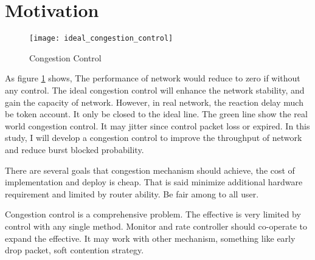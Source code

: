 \cleardoublepage
\section{Motivation}

\begin{figure}[!htbp]
    \label{fig:ideal_congestion_control}
    \begin{center}
        \leavevmode
        \ifpdf
        \else
        \texttt{[image: ideal\_congestion\_control]}
        \fi
        \caption{Congestion Control}
    \end{center}
\end{figure}

As figure \ref{fig:ideal_congestion_control} shows, The performance of network would reduce to zero if without any control. The ideal congestion control will enhance the network stability, and gain the capacity of network. However, in real network, the reaction delay much be token account. It only be closed to the ideal line. The green line show the real world congestion control. It may jitter since control packet loss or expired. In this study, I will develop a congestion control to
improve the throughput of network and reduce burst blocked probability.

There are several goals that congestion mechanism should achieve, the cost of implementation and deploy is cheap. That is said minimize additional hardware requirement and limited by router ability. Be fair among to all user.   

Congestion control is a comprehensive problem. The effective is very limited by control with any single method. Monitor and rate controller should co-operate to expand the effective. It may work with other mechanism, something like early drop packet, soft contention strategy.  
